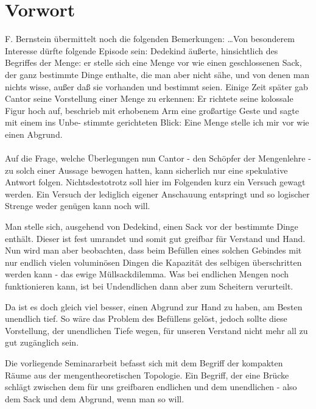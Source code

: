 \chapter{Vorwort}

F. Bernstein übermittelt noch die folgenden Bemerkungen:
\glqq \dots Von besonderem Interesse dürfte folgende Episode sein: Dedekind äußerte, hinsichtlich 
des Begriffes der Menge: er stelle sich eine Menge vor wie einen geschlossenen
Sack, der ganz bestimmte Dinge enthalte, die man aber nicht sähe, und von denen man
nichts wisse, außer daß sie vorhanden und bestimmt seien. Einige Zeit später gab Cantor
seine Vorstellung einer Menge zu erkennen: Er richtete seine kolossale Figur hoch auf,
beschrieb mit erhobenem Arm eine großartige Geste und sagte mit einem ins Unbe-
stimmte gerichteten Blick: \glqq Eine Menge stelle ich mir vor wie einen Abgrund.\grqq 
\\
\\

Auf die Frage, welche Überlegungen nun Cantor - den Schöpfer der Mengenlehre - 
zu solch einer Aussage bewogen hatten, kann sicherlich nur eine spekulative Antwort folgen.
Nichtsdestotrotz soll hier im Folgenden kurz ein Versuch gewagt werden. Ein Versuch der lediglich
eigener Anschauung entspringt und so logischer Strenge weder genügen kann noch will.

Man stelle sich, ausgehend von Dedekind, einen Sack vor der bestimmte Dinge enthält.
Dieser ist fest umrandet und somit gut greifbar für Verstand und Hand. Nun wird man
aber beobachten, dass beim Befüllen eines solchen Gebindes mit nur endlich vielen voluminösen Dingen 
die Kapazität des selbigen überschritten werden kann - das ewige \glqq Müllsackdilemma\grqq .
Was bei endlichen Mengen noch funktionieren kann, ist bei Undendlichen dann aber zum Scheitern verurteilt.

Da ist es doch gleich viel besser, einen Abgrund zur Hand zu haben, am Besten unendlich tief. So wäre
das Problem des Befüllens gelöst, jedoch sollte diese Vorstellung, der unendlichen Tiefe wegen, für unseren
Verstand nicht mehr all zu gut zugänglich sein.

Die vorliegende Seminararbeit befasst sich mit dem Begriff der kompakten Räume aus der mengentheoretischen
Topologie. Ein Begriff, der eine Brücke schlägt zwischen dem für uns greifbaren endlichen und dem
unendlichen - also dem Sack und dem Abgrund, wenn man so will.

